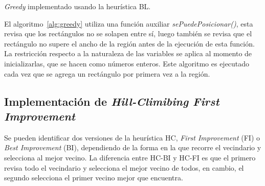 \documentclass[letter, 10pt]{article}
\begin{document}
\begin{algorithm}[H]
\caption{\emph{Greedy} implementado usando la heur\'istica BL.}
\label{alg:greedy}

\SetNoFillComment 



\end{algorithm}
\vspace{0.2cm}

El algoritmo~\ref{alg:greedy} utiliza una funci\'on auxiliar \emph{sePuedePosicionar()}, esta revisa que los rect\'angulos no se solapen entre s\'i, luego tambi\'en se revisa que el rect\'angulo no supere el ancho de la regi\'on antes de la ejecuci\'on de esta funci\'on. La restricci\'on respecto a la naturaleza de las variables se aplica al momento de inicializarlas, que se hacen como n\'umeros enteros. Este algoritmo es ejecutado cada vez que se agrega un rect\'angulo por primera vez a la regi\'on.

\subsection{Implementaci\'on de \emph{Hill-Climibing First Improvement}}

Se pueden identificar dos versiones de la heur\'istica HC, \emph{First Improvement} (FI) o \emph{Best Improvement} (BI), dependiendo de la forma en la que recorre el vecindario y selecciona al mejor vecino. La diferencia entre HC-BI y HC-FI es que el primero revisa todo el vecindario y selecciona el mejor vecino de todos, en cambio, el segundo selecciona el primer vecino mejor que encuentra.
\end{document}

